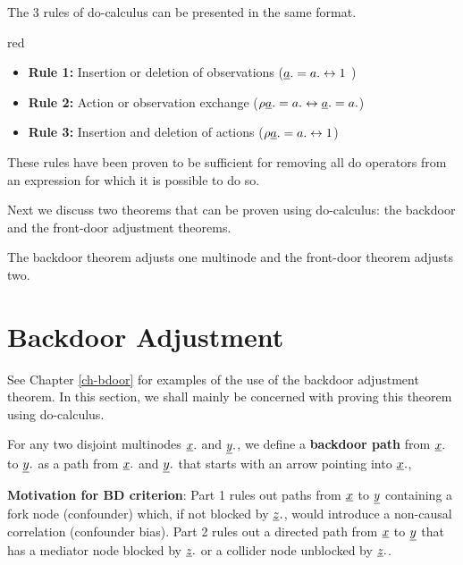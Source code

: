 The 3 rules of do-calculus
can be presented in the same
format. 


\begin{color}{red}
\begin{itemize}
\item {\bf Rule 1:} 
Insertion or deletion of
 observations 
(${\underline{a}}.=a. \leftrightarrow 1$ )


\item {\bf Rule 2:} Action or 
observation exchange 
($\rho {\underline{a}}.=a. \leftrightarrow {\underline{a}}.=a.$)


\item {\bf Rule 3:} Insertion and
 deletion of actions
($\rho {\underline{a}}.=a. \leftrightarrow 1$)



\end{itemize}
\end{color}

These rules have been
proven to be 
sufficient
for removing
all do operators
from an expression
for 
which it 
is possible to do so.

Next we discuss
two theorems that can be
proven using
do-calculus:
the backdoor and the
front-door
adjustment theorems.

The 
backdoor theorem 
adjusts one multinode
and the 
front-door theorem adjusts two.


\section{Backdoor Adjustment}

See Chapter \ref{ch-bdoor}
for examples of the use of the 
backdoor adjustment theorem.
In this section,
we shall mainly be
concerned with
proving this
theorem
using do-calculus.

For any two
disjoint
multinodes ${\underline{x}}.$
and ${\underline{y}}.$,
we define a {\bf backdoor path}
from ${\underline{x}}.$ to ${\underline{y}}.$
as a path from ${\underline{x}}.$
and ${\underline{y}}.$ that
starts with an arrow pointing into 
${\underline{x}}.$,

\bdoordef

{\bf Motivation for BD criterion}: 
Part 1 rules out
paths 
from ${\underline{x}}$
to ${\underline{y}}$
containing a fork node (confounder)
which, if not blocked by ${\underline{z}}.$, 
 would introduce a
non-causal correlation 
(confounder bias).
Part 2 rules out
a directed path
from ${\underline{x}}$ to ${\underline{y}}$
that has a mediator node
blocked by ${\underline{z}}.$
or a collider node
unblocked by ${\underline{z}}.$.



